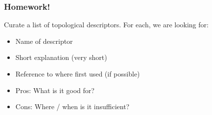 \begin{frame}

\frametitle{Homework!}

\begin{block}{}
Curate a list of topological descriptors.  For each, we are looking for:
\begin{itemize}
\item Name of descriptor
\item Short explanation (very short)
\item Reference to where first used (if possible)
\item Pros: What is it good for?
\item Cons: Where / when is it insufficient?
\end{itemize}
\end{block}

\end{frame}
